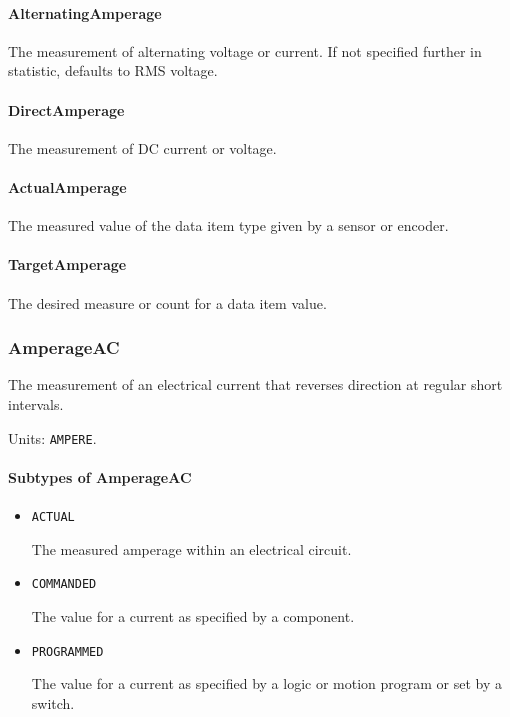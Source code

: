 \paragraph{AlternatingAmperage}\mbox{}
\label{sec:AlternatingAmperage}


The measurement of alternating voltage or current.   If not specified further in statistic, defaults to RMS voltage. 


\paragraph{DirectAmperage}\mbox{}
\label{sec:DirectAmperage}


The measurement of DC current or voltage.


\paragraph{ActualAmperage}\mbox{}
\label{sec:ActualAmperage}


The measured value of the data item type given by a sensor or encoder.


\paragraph{TargetAmperage}\mbox{}
\label{sec:TargetAmperage}


The desired measure or count for a data item value.


\subsubsection{AmperageAC}
\label{sec:AmperageAC}



The measurement of an electrical current that reverses direction at regular short intervals.


Units: \texttt{AMPERE}.

\paragraph{Subtypes of AmperageAC}\mbox{}
\label{sec:Subtypes of AmperageAC}

\begin{itemize}

\item \texttt{ACTUAL}


The measured amperage within an electrical circuit.

\item \texttt{COMMANDED}


The value for a current as specified by a component. 

\item \texttt{PROGRAMMED}


The value for a current as specified by a logic or motion program or set by a switch.


\end{itemize}

